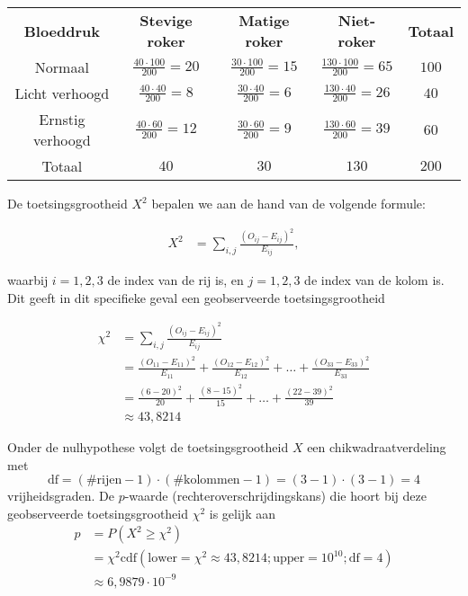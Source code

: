 {    \begin{center}
        \renewcommand{\arraystretch}{1.25}
        \begin{tabular}{ccccc}
            \toprule
                {\bfseries Bloeddruk} & {\bfseries Stevige roker} & {\bfseries Matige roker} & {\bfseries Niet-roker} & {\bfseries Totaal} \\
            \cmidrule{1-1} \cmidrule{2-2} \cmidrule{3-3} \cmidrule{4-4} \cmidrule{5-5}
                Normaal & $\frac{40\cdot 100}{200} = 20$ & $\frac{30\cdot 100}{200} = 15$ & $\frac{130\cdot 100}{200} = 65$ & $100$ \\
                Licht verhoogd & $\frac{40\cdot 40}{200} = 8$ & $\frac{30\cdot 40}{200} = 6$ & $\frac{130\cdot 40}{200} = 26$ & $40$ \\
                Ernstig verhoogd & $\frac{40\cdot 60}{200} = 12$ & $\frac{30\cdot 60}{200} = 9$ & $\frac{130\cdot 60}{200} = 39$ & $60$ \\
            \cmidrule{1-1} \cmidrule{2-2} \cmidrule{3-3} \cmidrule{4-4} \cmidrule{5-5}
                Totaal & $40$ & $30$ & $130$ & $200$ \\
            \bottomrule
        \end{tabular}
    \end{center}

    De toetsingsgrootheid $X^2$ bepalen we aan de hand van de volgende formule:

    \begin{align*}
        X^2  &= \sum_{i,j} \frac{(O_{ij} - E_{ij})^2}{E_{ij}},
    \end{align*}

    waarbij $i = 1,2,3$ de index van de rij is, en $j = 1,2,3$ de index van de kolom is.
    Dit geeft in dit specifieke geval een geobserveerde toetsingsgrootheid 
    
    \begin{align*}
        \chi^2  &= \sum_{i,j} \frac{(O_{ij} - E_{ij})^2}{E_{ij}} \\
                &=\frac{(O_{11} - E_{11})^2}{E_{11}} + \frac{(O_{12} - E_{12})^2}{E_{12}} + \ldots + \frac{(O_{33} - E_{33})^2}{E_{33}} \\
                &= \frac{(6 - 20)^2}{20} + \frac{(8 - 15)^2}{15} + \ldots + \frac{(22-39)^2}{39}\\
                &\approx 43,8214
    \end{align*}

    Onder de nulhypothese volgt de toetsingsgrootheid $X$ een chikwadraatverdeling met
    \[
        \text{df} = (\#\text{rijen}-1) \cdot (\#\text{kolommen}-1) = (3-1)\cdot(3-1) = 4
    \]
    vrijheidsgraden.
    De $p$-waarde (rechteroverschrijdingskans) die hoort bij deze geobserveerde toetsingsgrootheid $\chi^2$ is gelijk aan
    \begin{align*}
        p   &= P(X^2 \ge \chi^2) \\
            &= \chi^2\text{cdf}(\text{lower}=\chi^2\approx43,8214; \text{upper}=10^{10}; \text{df}=4) \\
            &\approx 6,9879 \cdot 10^{-9}
    \end{align*}

}
